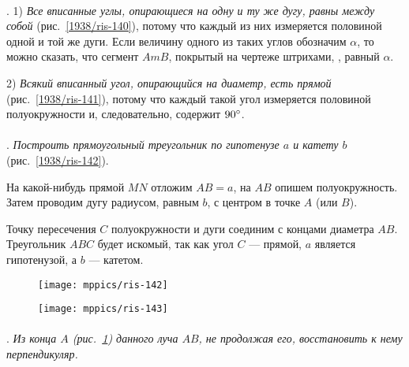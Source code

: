 \paragraph{}\label{1938/125}
. 
1) \emph{Все вписанные углы, опирающиеся на одну и ту же дугу, равны между собой} (рис.~\ref{1938/ris-140}), потому что каждый из них измеряется половиной одной и той же дуги.
Если величину одного из таких углов обозначим $\alpha$, то можно сказать, что сегмент $AmB$, покрытый на чертеже штрихами, , равный $\alpha$. 

2) \emph{Всякий вписанный угол, опирающийся на диаметр, есть прямой} (рис.~\ref{1938/ris-141}), потому что каждый такой угол измеряется половиной полуокружности и, следовательно, содержит $90\degree$.



\paragraph{}\label{1938/126}
.
\emph{Построить прямоугольный треугольник по гипотенузе $a$ и катету $b$} (рис.~\ref{1938/ris-142}).


На какой-нибудь прямой $MN$ отложим $AB=a$, на $AB$ опишем полуокружность.
Затем проводим дугу радиусом, равным $b$, с центром в точке $A$ (или $B$).

Точку пересечения $C$ полуокружности и дуги соединим с концами диаметра $AB$.
Треугольник $ABC$ будет искомый, так как угол $C$ — прямой, $a$ является гипотенузой, а $b$ — катетом.

\begin{figure}[h!]
\begin{minipage}{.48\textwidth}
\centering
\texttt{[image: mppics/ris-142]}
\end{minipage}
\hfill
\begin{minipage}{.48\textwidth}
\centering
\texttt{[image: mppics/ris-143]}
\end{minipage}

\medskip

\begin{minipage}{.48\textwidth}
\centering
\caption{}\label{1938/ris-142}
\end{minipage}
\hfill
\begin{minipage}{.48\textwidth}
\centering
\caption{}\label{1938/ris-143}
\end{minipage}
\vskip-4mm
\end{figure}

\paragraph{}\label{1938/127}
.
\emph{Из конца $A$ \emph{(рис.~\ref{1938/ris-143})} данного луча $AB$, не продолжая его, восстановить к нему перпендикуляр.}

